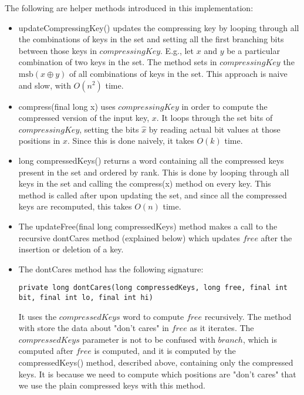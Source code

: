 The following are helper methods introduced in this implementation:
\begin{itemize}
    \item
    {\ttfamily updateCompressingKey()} updates the compressing key by looping through all the combinations of keys in the set and setting all the first branching bits between those keys in $compressingKey$. E.g., let $x$ and $y$ be a particular combination of two keys in the set. The method sets in $compressingKey$ the $\text{msb}(x \oplus y)$ of all combinations of keys in the set. This approach is naive and slow, with $O(n^2)$ time.
    
    \item
    {\ttfamily compress(final long x)} uses $compressingKey$ in order to compute the compressed version of the input key, $x$. It loops through the set bits of $compressingKey$, setting the bits $\hat x$ by reading actual bit values at those positions in $x$. Since this is done naively, it takes $O(k)$ time.

    \item
    {\ttfamily long compressedKeys()} returns a word containing all the compressed keys present in the set and ordered by rank. This is done by looping through all keys in the set and calling the {\ttfamily compress(x)} method on every key. This method is called after upon updating the set, and since all the compressed keys are recomputed, this takes $O(n)$ time.
    
    \item
    The {\ttfamily updateFree(final long compressedKeys)} method makes a call to the recursive {\ttfamily dontCares} method (explained below) which updates $free$ after the insertion or deletion of a key.

    \item
    The {\ttfamily dontCares} method has the following signature:
    \begin{lstlisting}
private long dontCares(long compressedKeys, long free, final int bit, final int lo, final int hi)
    \end{lstlisting}
    It uses the $compressedKeys$ word to compute $free$ recursively. The method with store the data about "don't cares" in $free$ as it iterates.
    The $compressedKeys$ parameter is not to be confused with $branch$, which is computed after $free$ is computed, and it is computed by the {\ttfamily compressedKeys()} method, described above, containing only the compressed keys. It is because we need to compute which positions are "don't cares" that we use the plain compressed keys with this method.
    

\end{itemize}
